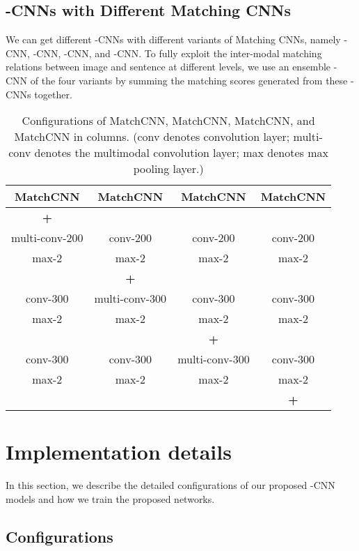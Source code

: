 \documentclass[10pt,twocolumn,letterpaper]{article}
\begin{document}
\subsection{-CNNs with Different Matching CNNs}


We can get different -CNNs with different variants of Matching CNNs, namely -CNN, -CNN, -CNN, and -CNN. To fully exploit the inter-modal matching relations between image and sentence at different levels, we use an ensemble -CNN of the four variants  by summing the matching scores generated from these -CNNs together.




\begin{table}\footnotesize
\begin{center}
\begin{tabular}{|c|c|c|c|}
\hline
MatchCNN&MatchCNN&MatchCNN&MatchCNN\\
\hline\hline
\textbf{+ }& & & \\
\hline\hline
multi-conv-200&conv-200&conv-200&conv-200\\
\hline\hline
max-2 &max-2 &max-2&max-2 \\
\hline\hline
& \textbf{+ }&& \\
\hline\hline
conv-300 &multi-conv-300 &conv-300&conv-300 \\
\hline\hline
max-2 &max-2&max-2&max-2 \\
\hline\hline
& & \textbf{+ }& \\
\hline\hline
conv-300&conv-300&multi-conv-300&conv-300 \\
\hline\hline
max-2&max-2&max-2&max-2 \\
\hline\hline
&&&\textbf{+ } \\
\hline
\end{tabular}
\end{center}
\caption{Configurations of MatchCNN, MatchCNN, MatchCNN, and MatchCNN in columns. (conv denotes convolution layer; multi-conv denotes the multimodal convolution layer; max denotes max pooling layer.)}
\label{table:configuration}
\end{table}



\section{Implementation details}
In this section, we describe the detailed configurations of our proposed -CNN models and how we train the proposed networks.
\subsection{Configurations}
\end{document}

